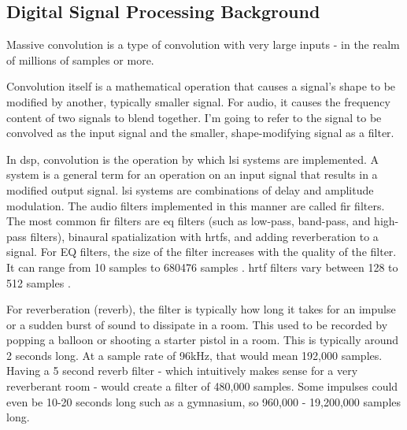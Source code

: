 \subsection{Digital Signal Processing Background}
\indent \par Massive convolution is a type of convolution with very large inputs - in the realm of millions of samples or more.

Convolution itself is a mathematical operation that causes a signal's shape to be modified by another, typically smaller signal. For audio, it causes the frequency content of two signals to blend together. I'm going to refer to the signal to be convolved as the input signal and the smaller, shape-modifying signal as a filter.

In \gls{dsp}, convolution is the operation by which \gls{lsi} systems are implemented. A system is a general term for an operation on an input signal that results in a modified output signal. \gls{lsi} systems are combinations of delay and amplitude modulation. The audio filters implemented in this manner are called \gls{fir} filters. The most common \gls{fir} filters are \gls{eq} filters (such as low-pass, band-pass, and high-pass filters), binaural spatialization with \glspl{hrtf}, and adding reverberation to a signal. For EQ filters, the size of the filter increases with the quality of the filter. It can range from 10 samples to 680476 samples \citep{lopo_2011}. \gls{hrtf} filters vary between 128 to 512 samples \citep{andreopoulou2011towards}. 

For reverberation (reverb), the filter is typically how long it takes for an impulse or a sudden burst of sound to dissipate in a room. This used to be recorded by popping a balloon or shooting a starter pistol in a room. This is typically around 2 seconds long. At a sample rate of 96kHz, that would mean 192,000 samples. Having a 5 second reverb filter - which intuitively makes sense for a very reverberant room - would create a filter of 480,000 samples. Some impulses could even be 10-20 seconds long such as a gymnasium, so 960,000 - 19,200,000 samples long.

